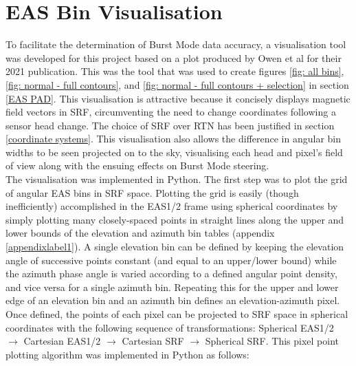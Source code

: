 \section{EAS Bin Visualisation}
To facilitate the determination of Burst Mode data accuracy, a visualisation tool was developed for this project based on a plot produced by Owen et al for their 2021 publication\cite{owen2021}. This was the tool that was used to create figures \ref{fig: all bins}, \ref{fig: normal - full contours}, and \ref{fig: normal - full contours + selection} in section \ref{EAS PAD}. This visualisation is attractive because it concisely displays magnetic field vectors in SRF, circumventing the need to change coordinates following a sensor head change. The choice of SRF over RTN has been justified in section \ref{coordinate systems}. This visualisation also allows the difference in angular bin widths to be seen projected on to the sky, visualising each head and pixel's field of view along with the ensuing effects on Burst Mode steering.
\\

The visualisation was implemented in Python. The first step was to plot the grid of angular EAS bins in SRF space. Plotting the grid is easily (though inefficiently) accomplished in the EAS1/2 frame using spherical coordinates by simply plotting many closely-spaced points in straight lines along the upper and lower bounds of the elevation and azimuth bin tables (appendix \ref{appendixlabel1}). A single elevation bin can be defined by keeping the elevation angle of successive points constant (and equal to an upper/lower bound) while the azimuth phase angle is varied according to a defined angular point density, and vice versa for a single azimuth bin. Repeating this for the upper and lower edge of an elevation bin and an azimuth bin defines an elevation-azimuth pixel. Once defined, the points of each pixel can be projected to SRF space in spherical coordinates with the following sequence of transformations: Spherical EAS1/2 \(\rightarrow\) Cartesian EAS1/2 \(\rightarrow\) Cartesian SRF \(\rightarrow\) Spherical SRF. This pixel point plotting algorithm was implemented in Python as follows:
\\

